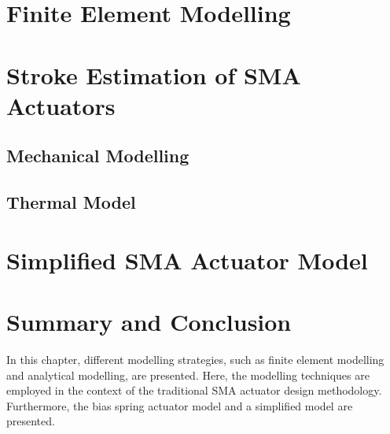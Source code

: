 \section{Finite Element Modelling}
\section{Stroke Estimation of SMA Actuators}
\subsection{Mechanical Modelling}
\subsection{Thermal Model}
\section{Simplified SMA Actuator Model}\label{sec:simplified-sma-model}
\section{Summary and Conclusion}
In this chapter, different modelling strategies, such as finite element modelling and analytical modelling, are presented. Here, the modelling techniques are employed in the context of the traditional SMA actuator design methodology. Furthermore, the bias spring actuator model and a simplified model are presented.
